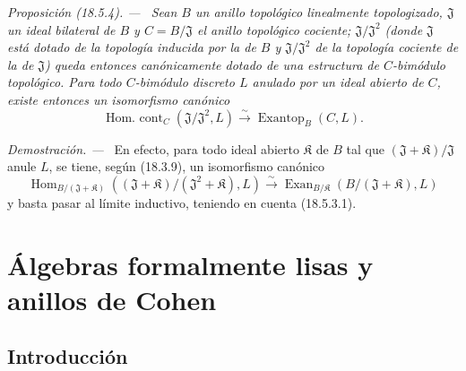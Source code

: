 \documentclass[10pt,oneside]{book}
\makeatletter
\newcommand{\setmanualcurrentlabel}[1]{\def\@currentlabel{#1}}
\newcommand{\oldpage}[2][]{%
  \setcounter{footnote}{0}%
  \marginpar{\scriptsize\textbf{#1}~|~#2}\ignorespaces}
\newenvironment{proposition}[1][]{%
  \setmanualcurrentlabel{#1}\par\medskip\noindent\itshape Proposición (#1). ---\ }{\par}
\newenvironment{proof}{%
  \par\medskip\noindent\textit{Demostración. ---\ }}{\par}
\makeatother
\begin{document}
\begin{proposition}[18.5.4]
\label{0.18.5.4-es}
Sean $B$ un anillo topológico linealmente topologizado, $\mathfrak J$ un
ideal bilateral de $B$ y $C=B/\mathfrak J$ el anillo topológico cociente;
$\mathfrak J/\mathfrak J^2$ (donde $\mathfrak J$ está dotado de la topología inducida
por la de $B$ y $\mathfrak J/\mathfrak J^2$ de la topología cociente de
la de $\mathfrak J$) queda entonces canónicamente dotado de una estructura de
$C$-bimódulo topológico. Para todo $C$-bimódulo discreto $L$ anulado por un
ideal abierto de $C$, existe entonces un isomorfismo canónico
\begin{equation}
\label{0.18.5.4.1-es}
\tag{18.5.4.1}
  \operatorname{Hom.\ cont}_C(\mathfrak J/\mathfrak J^2,L)
  \xrightarrow{\sim}\operatorname{Exantop}_B(C,L).
\end{equation}
\end{proposition}

\begin{proof}
En efecto, para todo ideal abierto $\mathfrak K$ de $B$ tal que
$(\mathfrak J+\mathfrak K)/\mathfrak J$ anule $L$, se tiene, según (18.3.9),
un isomorfismo canónico
\[
  \operatorname{Hom}_{B/(\mathfrak J+\mathfrak K)}
    ((\mathfrak J+\mathfrak K)/(\mathfrak J^2+\mathfrak K),L)
  \xrightarrow{\sim}
  \operatorname{Exan}_{B/\mathfrak K}(B/(\mathfrak J+\mathfrak K),L)
\]
y basta pasar al límite inductivo, teniendo en cuenta (18.5.3.1).
\end{proof}

\section{Álgebras formalmente lisas y anillos de Cohen}
\label{section:0.19-es}
\label{0.19-es}

\setcounter{subsection}{-1}
\subsection{Introducción}
\label{subsection:0.19.0-es}
\label{0.19.0-es}

\oldpage[0\textsubscript{IV-1}]{69}
\end{document}
